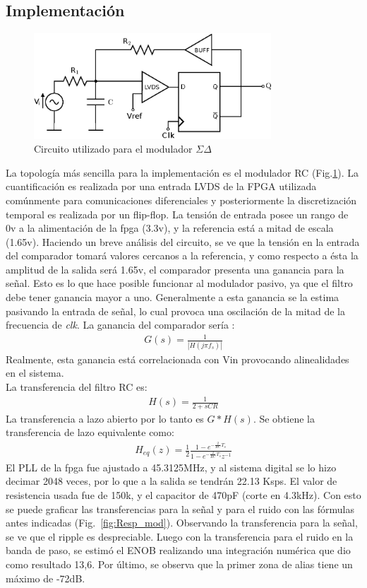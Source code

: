 \documentclass[a4paper,conference]{IEEEtran}
\begin{document}
\subsection{Implementaci\'on}

\begin{figure}[!t]
\centering
\includegraphics[width=3.5in]{Sigma-Delta_RC}
\caption{Circuito utilizado para el modulador $\Sigma\Delta$}
\label{fig_SDRC}
\end{figure}

La topolog\'ia m\'as sencilla para la implementaci\'on es el modulador RC (Fig.\ref{fig_SDRC}). La cuantificaci\'on es realizada por una entrada LVDS de la FPGA\cite{Sp6-IO} utilizada com\'unmente para comunicaciones diferenciales y posteriormente la discretizaci\'on temporal es realizada por un flip-flop. La tensi\'on de entrada posee un rango de 0v a la alimentación de la fpga (3.3v), y la referencia está a mitad de escala (1.65v).  Haciendo un breve an\'alisis del circuito, se ve que la tensi\'on en la entrada del comparador tomar\'a valores cercanos a la referencia, y como respecto a \'esta la amplitud de la salida ser\'a 1.65v, el comparador presenta una ganancia para la se\~nal. Esto es lo que hace posible funcionar al modulador pasivo, ya que el filtro debe tener ganancia mayor a uno. Generalmente a esta ganancia se la estima pasivando la entrada de señal, lo cual provoca una oscilación de la mitad de la frecuencia de \textit{clk}. La ganancia del comparador ser\'ia :
\begin{align}
G(s)=\frac{1}{|H(j\pi f_s)|}
\end{align}
Realmente, esta ganancia está correlacionada con Vin provocando alinealidades en el sistema.\\
La transferencia del filtro RC es:
\begin{align}
H(s)=\frac{1}{2+sCR}
\end{align}
La transferencia a lazo abierto por lo tanto es $G*H(s)$. 
Se obtiene la transferencia de lazo equivalente como:
\begin{align}
H_{eq}(z)=\frac{1}{2}\frac{1-e^{-\frac{2}{RC}T_s}}{1-e^{-\frac{2}{RC}T_s}z^{-1}}
\end{align}
El PLL de la fpga fue ajustado a 45.3125MHz, y al sistema digital se lo hizo decimar 2048 veces, por lo que a la salida se tendrán 22.13 Ksps. El valor de resistencia usada fue de 150k, y el capacitor de 470pF (corte en 4.3kHz).
Con esto se puede graficar las transferencias para la señal y para el ruido con las fórmulas antes indicadas (Fig.~\ref{fig:Resp_mod}). Observando la transferencia para la señal, se ve que el ripple es despreciable. Luego con la transferencia para el ruido en la banda de paso, se estimó el ENOB realizando una integraci\'on num\'erica que dio como resultado 13,6. Por último, se observa que la primer zona de alias tiene un m\'aximo de -72dB.
\end{document}
